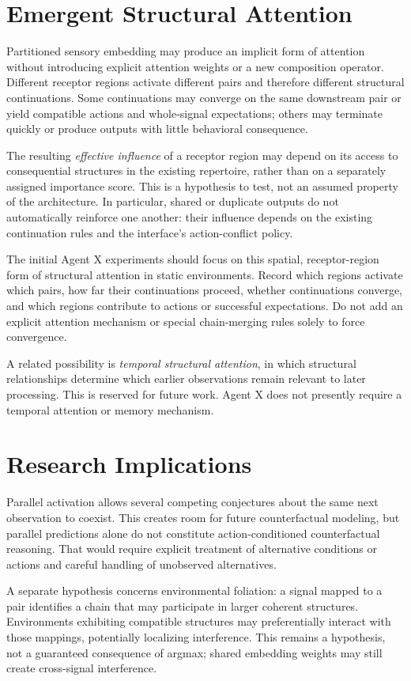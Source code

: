 \documentclass[11pt]{article}
\begin{document}
\section{Emergent Structural Attention}
Partitioned sensory embedding may produce an implicit form of attention without introducing explicit attention weights or a new composition operator. Different receptor regions activate different pairs and therefore different structural continuations. Some continuations may converge on the same downstream pair or yield compatible actions and whole-signal expectations; others may terminate quickly or produce outputs with little behavioral consequence.

The resulting \emph{effective influence} of a receptor region may depend on its access to consequential structures in the existing repertoire, rather than on a separately assigned importance score. This is a hypothesis to test, not an assumed property of the architecture. In particular, shared or duplicate outputs do not automatically reinforce one another: their influence depends on the existing continuation rules and the interface's action-conflict policy.

The initial Agent X experiments should focus on this spatial, receptor-region form of structural attention in static environments. Record which regions activate which pairs, how far their continuations proceed, whether continuations converge, and which regions contribute to actions or successful expectations. Do not add an explicit attention mechanism or special chain-merging rules solely to force convergence.

A related possibility is \emph{temporal structural attention}, in which structural relationships determine which earlier observations remain relevant to later processing. This is reserved for future work. Agent X does not presently require a temporal attention or memory mechanism.

\section{Research Implications}
Parallel activation allows several competing conjectures about the same next observation to coexist. This creates room for future counterfactual modeling, but parallel predictions alone do not constitute action-conditioned counterfactual reasoning. That would require explicit treatment of alternative conditions or actions and careful handling of unobserved alternatives.

A separate hypothesis concerns environmental foliation: a signal mapped to a pair identifies a chain that may participate in larger coherent structures. Environments exhibiting compatible structures may preferentially interact with those mappings, potentially localizing interference. This remains a hypothesis, not a guaranteed consequence of argmax; shared embedding weights may still create cross-signal interference.
\end{document}
